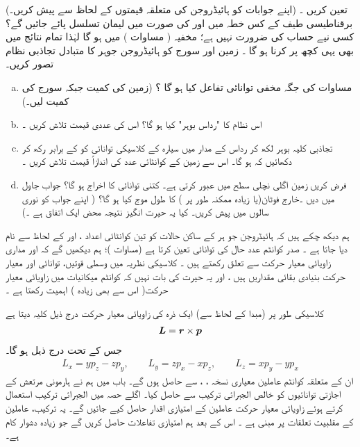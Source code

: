  تعین کریں ۔ (اپنے جوابات کو  ہائیڈروجن  کی متعلقہ قیمتوں کے لحاظ سے پیش کریں۔)   برقناطیسی طیف کے کس خطہ میں   اور   کی صورت میں   لیمان   تسلسل پائے جائیں گے؟    کسی نیے  حساب کی ضرورت نہیں ہے؛   مخفیہ (  مساوات )   میں    ہو گا لہٰذا تمام  نتائج میں بھی یہی کچھ پر کرنا  ہو  گا  ۔
زمین اور سورج کو ہائیڈروجن  جوہر کا متبادل تجاذبی نظام تصور کریں۔
\begin{enumerate}[a.]
\item
 مساوات    کی جگہ مخفی توانائی تفاعل کیا  ہو گا ؟  (زمین کی کمیت   جبکہ سورج کی کمیت  لیں۔)
\item
اس نظام کا   "رداس بوہر"    کیا ہو گا؟ اس کی عددی قیمت تلاش کریں ۔
\item
تجاذبی کلیہ  بوہر  لکھ کر  رداس   کے مدار میں سیارہ  کے کلاسیکی توانائی کو   کے برابر رکھ کر  دکھائیں کہ  ہو گا۔ اس سے زمین کے کوانٹائی  عدد  کی اندازاً قیمت تلاش کریں ۔
\item
فرض کریں  زمین  اگلی نچلی سطح    میں عبور کرتی  ہے۔  کتنی توانائی  کا اخراج ہو گا؟  جواب   جاول   میں دیں ۔خارج   فوٹان(یا   زیادہ ممکنہ طور پر )   کا طول موج کیا ہو گا؟ ( اپنے جواب کو نوری سالوں میں پیش کریں۔ کیا یہ حیرت انگیز  نتیجہ محض ایک اتفاق ہے ۔)
\end{enumerate}

ہم دیکھ چکے ہیں کہ ہائیڈروجن جو ہر کے ساکن حالات کو تین کوانٹائی اعداد ،   اور  کے لحاظ سے نام دیا جاتا ہے ۔ صدر کوانٹم عدد   حال کی توانائی تعین کرتا ہے  (مساوات  )؛  ہم دیکھیں گے کہ  اور  مداری زاویائی معیار حرکت سے تعلق رکھتے ہیں ۔ کلاسیکی نظریہ میں وسطی قوتیں،  توانائی اور معیار حرکت بنیادی بقائی مقداریں ہیں ،  اور یہ حیرت کی  بات نہیں  کہ کوانٹم میکانیات میں  زاویائی معیار حرکت( اس سے بھی زیادہ ) اہمیت  رکھتا ہے ۔

 کلاسیکی طور پر  (مبدا کے لحاظ سے)  ایک ذرہ کی زاویائی معیار حرکت درج ذیل کلیہ دیتا ہے 
\begin{align}
{\ensuremath{{\boldsymbol{L}}}}={{\boldsymbol{r}}}\times{\ensuremath{{\boldsymbol{p}}}}
\end{align}
جس کے تحت درج ذیل ہو گا۔
\begin{align}
L_{x}=yp_{z}-zp_{y}, \quad\quad L_{y}=zp_{x}-xp_{z}, \quad \quad L_{z}=xp_{y}-yp_{x}
\end{align}
ان کے متعلقہ کوانٹم عاملین معیاری نسخہ ، ،    سے حاصل ہوں گے۔ باب    میں ہم نے ہارمونی مرتعش کے اجازتی  توانائیوں کو خالص الجبرائی ترکیب سے حاصل کیا۔  اگلے  حصہ میں  الجبرائی ترکیب  استعمال کرتے ہوئے زاویائی معیار حرکت  عاملین کے امتیازی اقدار حاصل کیے جائیں گے۔ یہ ترکیب،  عاملین کے  مقلبیت  تعلقات پر مبنی ہے ۔ اس کے بعد ہم امتیازی تفاعلات حاصل کریں گے جو  زیادہ دشوار کام ہے۔

